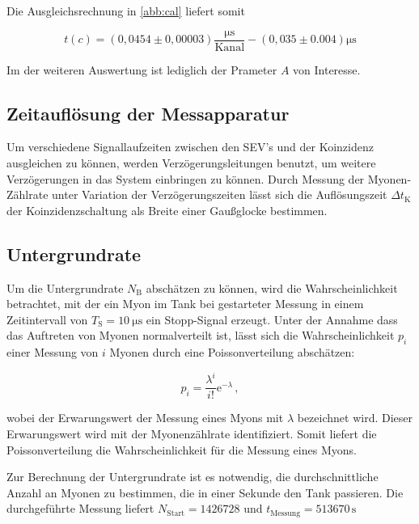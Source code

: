 \noindent Die Ausgleichsrechnung in \ref{abb:cal} liefert somit

\begin{equation}
	t(c) = (0,0454 \pm 0,00003)\frac{\si{\micro\second}}{\text{Kanal}} - (0,035 \pm 0.004) \si{\micro\second}
\end{equation}

\noindent Im der weiteren Auswertung ist lediglich der Prameter $A$ von Interesse.

\subsection{Zeitauflösung der Messapparatur}
\label{subsec:timeresolution}
Um verschiedene Signallaufzeiten zwischen den SEV's und der Koinzidenz ausgleichen zu können, werden Verzögerungsleitungen benutzt, um weitere Verzögerungen in das System einbringen zu können. Durch Messung der Myonen-Zählrate unter Variation der Verzögerungszeiten lässt sich die Auflösungszeit $\Delta t_\text{K}$ der Koinzidenzschaltung als Breite einer Gaußglocke bestimmen.


\subsection{Untergrundrate}
\label{subsec:underground}

Um die Untergrundrate $N_\text{B}$ abschätzen zu können, wird die Wahrscheinlichkeit betrachtet, mit der ein Myon im Tank bei gestarteter Messung in einem Zeitintervall von $T_\text{S} = \SI{10}{\micro \second}$ ein Stopp-Signal erzeugt. Unter der Annahme dass das Auftreten von Myonen normalverteilt ist, lässt sich die Wahrscheinlichkeit $p_i$ einer Messung von $i$ Myonen durch eine Poissonverteilung abschätzen:

\begin{equation}
p_i = \frac{\lambda^i}{i!}\mathrm{e}^{-\lambda}\,,
\end{equation}

\noindent wobei der Erwarungswert der Messung eines Myons mit $\lambda$ bezeichnet wird. Dieser Erwarungswert wird mit der Myonenzählrate identifiziert. Somit liefert die Poissonverteilung die Wahrscheinlichkeit
für die Messung eines Myons.

\noindent Zur Berechnung der Untergrundrate ist es notwendig, die durchschnittliche Anzahl an Myonen zu bestimmen, die in einer Sekunde den Tank passieren.
Die durchgeführte Messung liefert $N_{\text{Start}} = 1426728$ und $t_{\text{Messung}} = 513670 \, \si{\second}$

